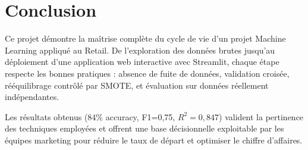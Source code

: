 \documentclass[11pt,a4paper]{article}
\begin{document}
\section{Conclusion}

Ce projet démontre la maîtrise complète du cycle de vie d'un projet Machine Learning appliqué au Retail. De l'exploration des données brutes jusqu'au déploiement d'une application web interactive avec Streamlit, chaque étape respecte les bonnes pratiques : absence de fuite de données, validation croisée, rééquilibrage contrôlé par SMOTE, et évaluation sur données réellement indépendantes.

Les résultats obtenus (84\% accuracy, F1=0,75, $R^2=0,847$) valident la pertinence des techniques employées et offrent une base décisionnelle exploitable par les équipes marketing pour réduire le taux de départ et optimiser le chiffre d'affaires.
\end{document}
